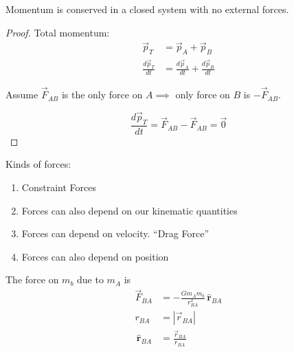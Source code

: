 \documentclass[twoside]{scrartcl}
\let\oldhat\hat
\renewcommand{\hat}[1]{\,\oldhat{\boldsymbol{\mathbf{#1}}}}
\begin{document}
\begin{theorem}
	Momentum is conserved in a closed system with no external forces.
\end{theorem}

\begin{proof}
Total momentum:
\[\begin{aligned}
\vec{p}_T &= \vec{p}_A + \vec{p}_B\\
\frac{d\vec{p}_T}{dt} &= \frac{d\vec{p}_A}{dt} + \frac{d\vec{p}_B}{dt}	
\end{aligned}
\]

Assume $\vec{F}_{AB}$ is the only force on $A \implies$ only force on $B$ is $-\vec{F}_{AB}$. 

\[\frac{d\vec{p}_T}{dt} = \vec{F}_{AB} - \vec{F}_{AB} = \vec{0}\]
\end{proof}



Kinds 
 of forces:
\begin{enumerate}
\item Constraint Forces
\item Forces can also depend on our kinematic quantities
\item Forces can depend on velocity. ``Drag Force''
\item Forces can also depend on position	
\end{enumerate}


  \begin{center}
  \end{center}

The force on $m_b$ due to $m_A$ is 
\[
\begin{aligned}
\vec{F}_{BA} &= -\frac{Gm_Am_b}{r^2_{BA}}\hat{r}_{BA}\\
r_{BA} &= |\vec{r}_{BA}|\\
\hat{r}_{BA} &= \frac{\vec{r}_{BA}}{r_{BA}}
\end{aligned}
\]
\end{document}
